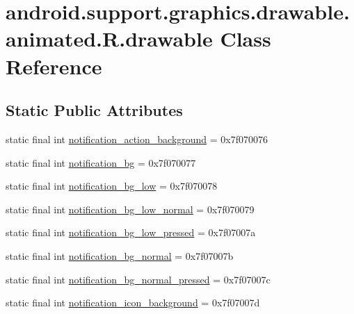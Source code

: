 \hypertarget{classandroid_1_1support_1_1graphics_1_1drawable_1_1animated_1_1_r_1_1drawable}{}\section{android.\+support.\+graphics.\+drawable.\+animated.\+R.\+drawable Class Reference}
\label{classandroid_1_1support_1_1graphics_1_1drawable_1_1animated_1_1_r_1_1drawable}
\subsection*{Static Public Attributes}
\begin{DoxyCompactItemize}
\item 
static final int \mbox{\hyperlink{classandroid_1_1support_1_1graphics_1_1drawable_1_1animated_1_1_r_1_1drawable_a11bf3dd87b85eec07b682350dce74f85}{notification\+\_\+action\+\_\+background}} = 0x7f070076
\item 
static final int \mbox{\hyperlink{classandroid_1_1support_1_1graphics_1_1drawable_1_1animated_1_1_r_1_1drawable_a867e41930939ea97edaed48e8c3f9677}{notification\+\_\+bg}} = 0x7f070077
\item 
static final int \mbox{\hyperlink{classandroid_1_1support_1_1graphics_1_1drawable_1_1animated_1_1_r_1_1drawable_ae36224aa069ed404237d9d5ec69a6d24}{notification\+\_\+bg\+\_\+low}} = 0x7f070078
\item 
static final int \mbox{\hyperlink{classandroid_1_1support_1_1graphics_1_1drawable_1_1animated_1_1_r_1_1drawable_a9da9694ce9c699c8014efb3291936fa8}{notification\+\_\+bg\+\_\+low\+\_\+normal}} = 0x7f070079
\item 
static final int \mbox{\hyperlink{classandroid_1_1support_1_1graphics_1_1drawable_1_1animated_1_1_r_1_1drawable_ae6eb1de4089432615613842d9321c3ac}{notification\+\_\+bg\+\_\+low\+\_\+pressed}} = 0x7f07007a
\item 
static final int \mbox{\hyperlink{classandroid_1_1support_1_1graphics_1_1drawable_1_1animated_1_1_r_1_1drawable_a386dcd24ded6a7299fee657aceb353ba}{notification\+\_\+bg\+\_\+normal}} = 0x7f07007b
\item 
static final int \mbox{\hyperlink{classandroid_1_1support_1_1graphics_1_1drawable_1_1animated_1_1_r_1_1drawable_a863b5c208c30d1d07332657c216a2af2}{notification\+\_\+bg\+\_\+normal\+\_\+pressed}} = 0x7f07007c
\item 
static final int \mbox{\hyperlink{classandroid_1_1support_1_1graphics_1_1drawable_1_1animated_1_1_r_1_1drawable_a22985c9b80fbf6074397962a880837b7}{notification\+\_\+icon\+\_\+background}} = 0x7f07007d

\end{DoxyCompactItemize}
